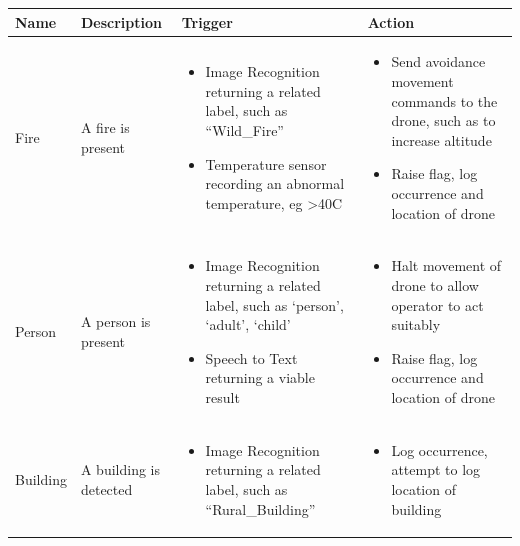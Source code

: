 \documentclass{article}
\begin{document}
\vspace{\baselineskip}
{
\hyphenchar{}
\centering
\begin{tabular}{| >{\centering\arraybackslash}m{2cm} | >{\centering\arraybackslash}m{2.5cm} | p{5cm} | p{5cm} |}
    \hline
    Name & Description & Trigger & Action \\ \hline
    Fire & \vspace{\baselineskip} A fire is present &
    \begin{itemize}[topsep=0pt, leftmargin=0cm,itemindent=.5cm,labelwidth=\itemindent,labelsep=0cm,align=left]
        \item Image Recognition returning a related label, such as “Wild\_Fire”
        \item Temperature sensor recording an abnormal temperature, eg >40C
    \end{itemize} &
    \begin{itemize} [topsep=0pt, leftmargin=0cm,itemindent=.5cm,labelwidth=\itemindent,labelsep=0cm,align=left]
        \item Send avoidance movement commands to the drone, such as to increase altitude
        \item Raise flag, log occurrence and location of drone
    \end{itemize} \\ \hline

    Person & \vspace{\baselineskip} A person is present &
    \begin{itemize} [topsep=0pt, leftmargin=0cm,itemindent=.5cm,labelwidth=\itemindent,labelsep=0cm,align=left]
        \item Image Recognition returning a related label, such as `person', `adult', `child'
        \item Speech to Text returning a viable result
    \end{itemize} &
    \begin{itemize} [topsep=0pt, leftmargin=0cm,itemindent=.5cm,labelwidth=\itemindent,labelsep=0cm,align=left]
        \item Halt movement of drone to allow operator to act suitably
        \item Raise flag, log occurrence and location of drone
    \end{itemize} \\ \hline

    Building & \vspace{\baselineskip} A building is detected &
    \begin{itemize} [topsep=0pt, leftmargin=0cm,itemindent=.5cm,labelwidth=\itemindent,labelsep=0cm,align=left]
        \item Image Recognition returning a related label, such as “Rural\_Building”
    \end{itemize} &
    \begin{itemize} [topsep=0pt, leftmargin=0cm,itemindent=.5cm,labelwidth=\itemindent,labelsep=0cm,align=left]
        \item Log occurrence, attempt to log location of building
    \end{itemize} \\ \hline


\end{tabular}}
\end{document}
